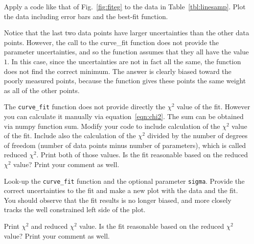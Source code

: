 \begin{plot} Apply a code like that of Fig.~\ref{fig:fiteg}
to the data in Table~\ref{tbl:linesamp}. Plot the data including error bars and the best-fit function.
\end{plot}

Notice that the last two data points have larger uncertainties than
the other data points.  However, the call to the {curve{\_}fit}
function does not provide the parameter uncertainties, and so the
function assumes that they all have the value $1$.  In this case,
since the uncertainties are not in fact all the same, the function
does not find the correct minimum.  The answer is clearly biased
toward the poorly measured points, because the function gives these
points the same weight as all of the other points.

\begin{print} The {\tt curve{\_}fit} function does not provide directly the $\chi^2$ value of the fit. However you can calculate it manually via equation~\ref{eqn:chi2}. The sum can be obtained via numpy function sum. Modify your code to include calculation of the $\chi^2$ value of the fit. Include also the calculation of the $\chi^2$ divided by the number of degrees of freedom (number of data points minus number of parameters), which is called reduced $\chi^2$. Print both of those values. Is the fit reasonable based on the reduced $\chi^2$ value? Print your comment as well. 
\end{print}

\begin{plot} Look-up the {\tt curve{\_}fit} function and the optional parameter
{\tt sigma}. Provide the correct uncertainties to
the fit and make a new plot with the data and the fit.  You should observe that the fit results is no longer biased,
and more closely tracks the well constrained left side of the plot. \end{plot}

\begin{print} Print $\chi^2$ and reduced $\chi^2$ value. Is the fit reasonable based on the reduced $\chi^2$ value? Print your comment as well. \end{print}

